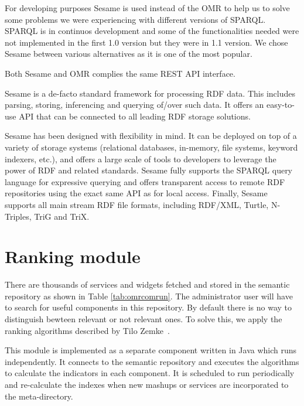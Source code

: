 For developing purposes Sesame is used instead of the OMR to help us to solve some problems we were experiencing with different versions of SPARQL. SPARQL is in continuos development and some of the functionalities needed were not implemented in the first 1.0 version but they were in 1.1 version. We chose Sesame between various alternatives as it is one of the most popular.

Both Sesame and OMR complies the same REST API interface.

Sesame is a de-facto standard framework for processing RDF data. This includes parsing, storing, inferencing and querying of/over such data. It offers an easy-to-use API that can be connected to all leading RDF storage solutions.

Sesame has been designed with flexibility in mind. It can be deployed on top of a variety of storage systems (relational databases, in-memory, file systems, keyword indexers, etc.), and offers a large scale of tools to developers to leverage the power of RDF and related standards. Sesame fully supports the SPARQL query language for expressive querying and offers transparent access to remote RDF repositories using the exact same API as for local access. Finally, Sesame supports all main stream RDF file formats, including RDF/XML, Turtle, N-Triples, TriG and TriX.

\section{Ranking module}
\label{sec:rankingmodule}
There are thousands of services and widgets fetched and stored in the semantic repository as shown in Table \ref{tab:omrcomrun}. The administrator user will have to search for useful components in this repository. By default there is no way to distinguish bewteen relevant or not relevant ones. To solve this, we apply the ranking algorithms described by Tilo Zemke~\cite{Tilo12}.

This module is implemented as a separate component written in Java which runs independently. It connects to the semantic repository and executes the algorithms to calculate the indicators in each component. It is scheduled to run periodically and re-calculate the indexes when new mashups or services are incorporated to the meta-directory.

